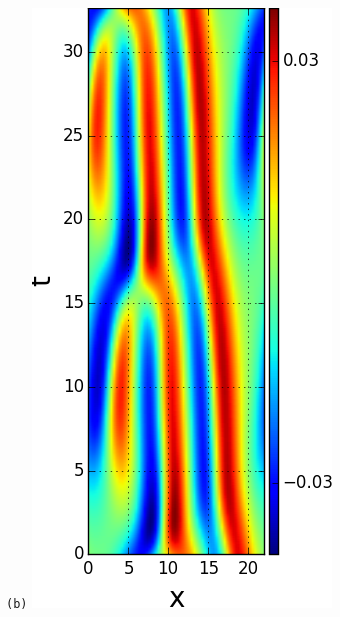 \documentclass[final,leqno,onefignum,onetabnum]{siamltexmm}
\begin{document}
\begin{figure}[h]
\begin{minipage}{.22\textwidth}
  \end{minipage}
  \begin{minipage}{.22\textwidth}
    \centering \small{\texttt{(b)}}
    \includegraphics[width=\textwidth]{rpo1State64}
  \end{minipage}%

\end{figure}
\end{document}
